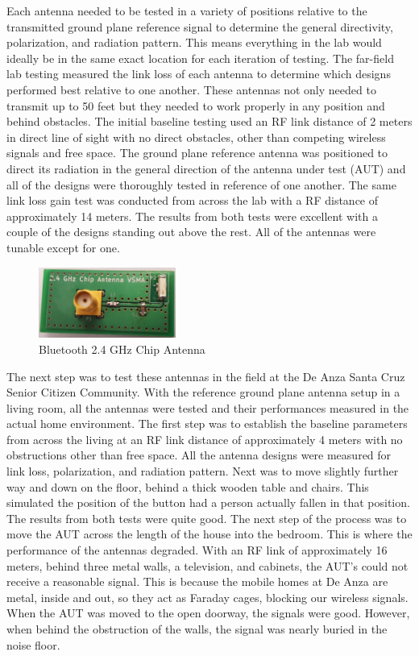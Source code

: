 \documentclass[journal,compsoc]{IEEEtran}
\begin{document}
Each antenna needed to be tested in a variety of positions relative to the transmitted ground plane reference signal to determine the general directivity, polarization, and radiation pattern.  This means everything in the lab would ideally be in the same exact location for each iteration of testing.  The far-field lab testing measured the link loss of each antenna to determine which designs performed best relative to one another.   These antennas not only needed to transmit up to 50 feet but they needed to work properly in any position and behind obstacles.  The initial baseline testing used an RF link distance of 2 meters in direct line of sight with no direct obstacles, other than competing wireless signals and free space.  The ground plane reference antenna was positioned to direct its radiation in the general direction of the antenna under test (AUT) and all of the designs were thoroughly tested in reference of one another.  The same link loss gain test was conducted from across the lab with a RF distance of approximately 14 meters.  The results from both tests were excellent with a couple of the designs standing out above the rest.  All of the antennas were tunable except for one.

\begin{figure}[ht]	%
\centering
\includegraphics[width=0.4\textwidth]{2_4GHzVChipAntenna.jpg}
\caption{Bluetooth 2.4 GHz Chip Antenna}
\label{2.4 Chip}
\end{figure}

The next step was to test these antennas in the field at the De Anza Santa Cruz Senior Citizen Community.  With the reference ground plane antenna setup in a living room, all the antennas were tested and their performances measured in the actual home environment.  The first step was to establish the baseline parameters from across the living at an RF link distance of approximately 4 meters with no obstructions other than free space.  All the antenna designs were measured for link loss, polarization, and radiation pattern.  Next was to move slightly further way and down on the floor, behind a thick wooden table and chairs.  This simulated the position of the button had a person actually fallen in that position.  The results from both tests were quite good.  The next step of the process was to move the AUT across the length of the house into the bedroom.  This is where the performance of the antennas degraded.  With an RF link of approximately 16 meters, behind three metal walls, a television, and cabinets, the AUT’s could not receive a reasonable signal.  This is because the mobile homes at De Anza are metal, inside and out, so they act as Faraday cages, blocking our wireless signals.  When the AUT was moved to the open doorway, the signals were good.  However, when behind the obstruction of the walls, the signal was nearly buried in the noise floor.
\end{document}
